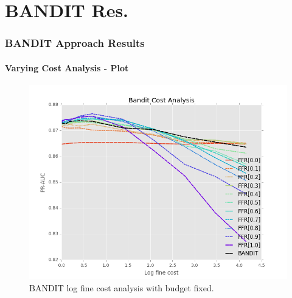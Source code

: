 \documentclass{beamer}
\begin{document}
\section{BANDIT Res.}
\begin{frame}
    \frametitle{BANDIT Approach Results}
    \framesubtitle{Varying Cost Analysis - Plot}
    \begin{figure}[!htb]
        \centering
        \includegraphics[width=0.70\columnwidth]{fig/BanditPlotLogFine}
        \caption{BANDIT log fine cost analysis with budget fixed.}
        \label{fig:BanditPlotLogFine}
    \end{figure}
\end{frame}
\end{document}
